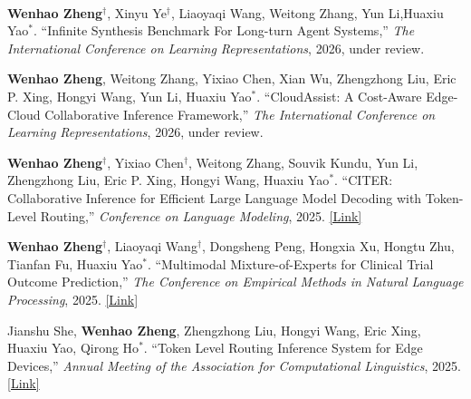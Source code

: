 \vspace{-2mm}

\begin{cventries}

    \cventry
    {} %
    {\ } %
    {\ } %
    {} %
    {
        \vspace{-9mm}
        \begin{cvitemize2}
            \item \textbf{Wenhao Zheng$^\dagger$}, Xinyu Ye$^\dagger$, Liaoyaqi Wang, Weitong Zhang, Yun Li,Huaxiu Yao$^*$. ``Infinite Synthesis Benchmark For Long-turn Agent Systems,'' \textit{The International Conference on Learning Representations}, 2026, under review.
            \item \textbf{Wenhao Zheng}, Weitong Zhang, Yixiao Chen, Xian Wu, Zhengzhong Liu, Eric P. Xing, Hongyi Wang, Yun Li, Huaxiu Yao$^*$. ``CloudAssist: A Cost-Aware Edge-Cloud Collaborative Inference Framework,'' \textit{The International Conference on Learning Representations}, 2026, under review.
            \vspace{1mm}
            \item \textbf{Wenhao Zheng$^\dagger$}, Yixiao Chen$^\dagger$, Weitong Zhang, Souvik Kundu, Yun Li, Zhengzhong Liu, Eric P. Xing, Hongyi Wang, Huaxiu Yao$^*$. ``CITER: Collaborative Inference for Efficient Large Language Model Decoding with Token-Level Routing,'' \textit{Conference on Language Modeling}, 2025. \href{https://openreview.net/forum?id=nqX9UYW9Af}{\textcolor{link}{[Link]}}
            \vspace{1mm}
            \item \textbf{Wenhao Zheng$^\dagger$}, Liaoyaqi Wang$^\dagger$, Dongsheng Peng, Hongxia Xu, Hongtu Zhu, Tianfan Fu, Huaxiu Yao$^*$. ``Multimodal Mixture-of-Experts for Clinical Trial Outcome Prediction,'' \textit{The Conference on Empirical Methods in Natural Language Processing}, 2025. \href{https://arxiv.org/abs/2402.06512}{\textcolor{link}{[Link]}}
            \vspace{1mm}
            \item Jianshu She, \textbf{Wenhao Zheng}, Zhengzhong Liu, Hongyi Wang, Eric Xing, Huaxiu Yao, Qirong Ho$^*$. ``Token Level Routing Inference System for Edge Devices,'' \textit{Annual Meeting of the Association for Computational Linguistics}, 2025. \href{https://arxiv.org/abs/2504.07878}{\textcolor{link}{[Link]}}

\end{cvitemize2}}
\end{cventries}
